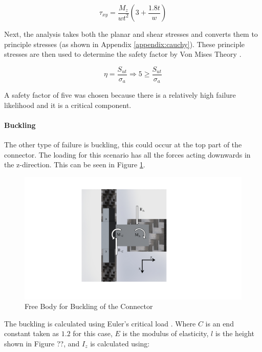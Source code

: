 \documentclass[../main.tex]{subfiles}
\begin{document}
\begin{equation} \label{eqn:armtorsionShear}
\tau_{xy} = \dfrac{M_{z}}{wt^2}(3+\frac{1.8t}{w})
\end{equation}

Next, the analysis takes both the planar and shear stresses and converts them to principle stresses (as shown in Appendix \ref{appendix:cauchy}). These principle stresses are then used to determine the safety factor by Von Mises Theory \cite[221]{shigley}.

\begin{equation}
\eta = \dfrac{S_{ut}}{\sigma _a} \Rightarrow 5 \geq \dfrac{S_{ut}}{\sigma _a}
\end{equation}

A safety factor of five was chosen because there is a relatively high failure likelihood and it is a critical component.\\

\paragraph*{Buckling}
The other type of failure is buckling, this could occur at the top part of the connector. The loading for this scenario has all the forces acting downwards in the z-direction. This can be seen  in Figure \ref{fig:armConnectorBuck}.

\begin{figure}[H]
	\centering
	\includegraphics[page={2}, width=.8\linewidth]{img/analysis/arm/armConnector.pdf}
	\caption{Free Body for Buckling of the Connector}
	\label{fig:armConnectorBuck}
\end{figure}

The buckling is calculated using Euler's critical load \cite[178]{shigley}. Where $C$ is an end constant taken as $1.2$ for this case, $E$ is the modulus of elasticity, $l$ is the height shown in Figure ??, and $I_z$ is calculated using: 
\end{document}
